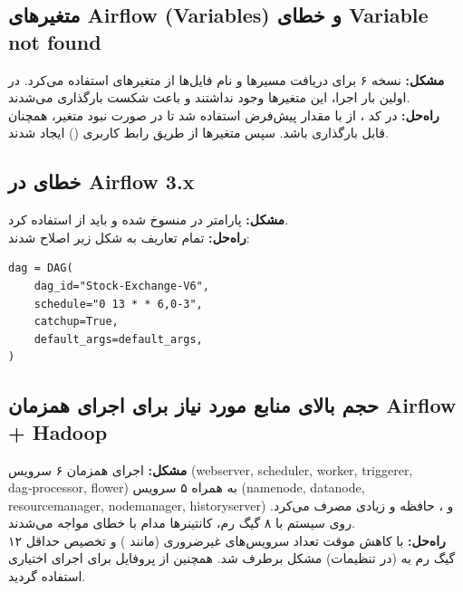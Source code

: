 \documentclass[12pt,a4paper]{article}
\begin{document}
\subsection{متغیرهای Airflow (Variables) و خطای Variable not found}
\textbf{مشکل:}  نسخه ۶ برای دریافت مسیرها و نام فایل‌ها از متغیرهای  استفاده می‌کرد. در اولین بار اجرا، این متغیرها وجود نداشتند و باعث شکست بارگذاری  می‌شدند. \\
\textbf{راه‌حل:} در کد ، از  با مقدار پیش‌فرض استفاده شد تا در صورت نبود متغیر،  همچنان قابل بارگذاری باشد. سپس متغیرها از طریق رابط کاربری  () ایجاد شدند.

\subsection{خطای  در Airflow 3.x}
\textbf{مشکل:} پارامتر  در  منسوخ شده و باید از  استفاده کرد. \\
\textbf{راه‌حل:} تمام تعاریف  به شکل زیر اصلاح شدند:
\begin{latin}
\begin{verbatim}
dag = DAG(
    dag_id="Stock-Exchange-V6",
    schedule="0 13 * * 6,0-3",
    catchup=True,
    default_args=default_args,
)
\end{verbatim}
\end{latin}

\subsection{حجم بالای منابع مورد نیاز برای اجرای همزمان Airflow + Hadoop}
\textbf{مشکل:} اجرای همزمان ۶ سرویس  (webserver, scheduler, worker, triggerer, dag‑processor, flower) به همراه ۵ سرویس  (namenode, datanode, resourcemanager, nodemanager, historyserver) و ، حافظه و  زیادی مصرف می‌کرد. روی سیستم با ۸ گیگ رم، کانتینرها مدام با خطای  مواجه می‌شدند. \\
\textbf{راه‌حل:} با کاهش موقت تعداد سرویس‌های غیرضروری (مانند ) و تخصیص حداقل ۱۲ گیگ رم به  (در تنظیمات) مشکل برطرف شد. همچنین از پروفایل  برای اجرای اختیاری  استفاده گردید.
\end{document}
